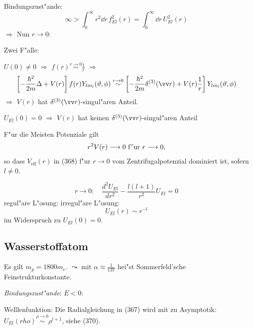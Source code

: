 \documentclass[a4paper]{scrartcl}
\begin{document}
{Bindungszust"ande:
$$\infty > \int_0^\infty r^2 \dd r \, f_{E l}^2 (r) = \int_0^\infty \dd r\, U_{E l}^2(r)$$
$\Longrightarrow$
Nun $r \longrightarrow 0$:

Zwei F"alle:
\begin{1aufz}
\item $U(0) \neq 0$ $\Longrightarrow$ $f(r) \stackrel{r \rightarrow 0}\sim \frac1r$ $\Longrightarrow$
$$\left[ - \frac{\hbar^2}{2m} \Delta + V(r) \right] f(r) Y_{l m_l} (\vartheta, \phi) \stackrel{r \rightarrow 0}\sim \left[ - \frac{\hbar^2}{2m} \delta^{(3)}(\vv r) + V(r) \frac1r \right] Y_{l m_l} (\vartheta, \phi) $$
$\Longrightarrow$ $V(r)$ hat $\delta^{(3)}(\vv r)$-singul"aren Anteil.
\item $U_{E l}(0) = 0$ $\Longrightarrow$ $V(r)$ hat keinen $\delta^{(3)}(\vv r)$-singul"aren Anteil
\end{1aufz}
F"ur die Meisten Potenziale gilt
$$r^2 V(r) \longrightarrow 0 \ \mathrm{f"ur \ } r \longrightarrow 0,$$
so dass $V_{\mathrm{eff}}(r)$ in (368) f"ur $r \longrightarrow 0$ vom Zentrifugalpotenzial dominiert ist, sofern $l \neq 0$.

$$r \longrightarrow 0: \quad \frac{d^2 U_{E l}}{d r^2} - \frac{l(l+1)}{r^2} U_{E l} = 0$$
regul"are L"osung:
irregul"are L"osung:
$$U_{E l}(r) \sim r^{-l}$$
im Widerspruch zu $U_{E l}(0) = 0$.

\subsection{Wasserstoffatom}

Es gilt $m_p = 1800 m_e$. $\leadsto$
mit 
$\alpha \approx \frac 1 {137}$ hei"st Sommerfeld'sche Feinstrukturkonstante.

\emph{Bindungszust"ande}: $E < 0$:

Welllenfunktion:
Die Radialgleichung in (367) wird mit
zu 
Asymptotik: $U_{E l}(rho) \stackrel{\rho \rightarrow 0}\sim \rho^{l+1}$, siehe (370).

}
\end{document}
